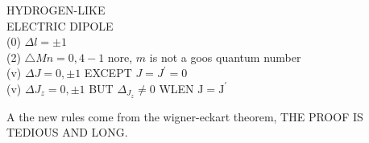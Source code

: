 \documentclass[10pt]{article}
\begin{document}
HYDROGEN-LIKE\\
ELECTRIC DIPOLE\\
(0) $\Delta l= \pm 1$\\
(2) $\triangle M n=0,4-1$ nore, $m$ is not a goos quantum number\\
(v) $\Delta J=0, \pm 1$ EXCEPT $J=J^{\prime}=0$\\
(v) $\Delta J_{z}=0, \pm 1$ BUT $\Delta_{J_{z}} \neq 0$ WLEN $\mathrm{J}=\mathrm{J}^{\prime}$

A the new rules come from the wigner-eckart theorem, THE PROOF IS TEDIOUS AND LONG.
\end{document}
